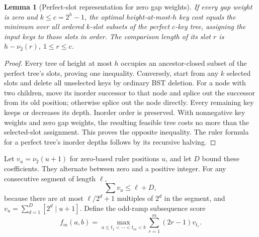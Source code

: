 \documentclass[11pt]{article}
\newtheorem{lemma}[theorem]{Lemma}
\begin{document}
\begin{lemma}[Perfect-slot representation for zero gap weights]
\label{lem:perfect-slots}
If every gap weight is zero and $k\le c=2^h-1$, the optimal height-at-most-$h$
key cost equals the minimum over all ordered $k$-slot subsets of the perfect
$c$-key tree, assigning the input keys to those slots in order. The comparison
length of its slot $r$ is $h-\nu_2(r)$, $1\le r\le c$.
\end{lemma}
\begin{proof}
Every tree of height at most $h$ occupies an ancestor-closed subset of the
perfect tree's slots, proving one inequality. Conversely, start from any
$k$ selected slots and delete all unselected keys by ordinary BST deletion.
For a node with two children, move its inorder successor to that node and
splice out the successor from its old position; otherwise splice out the
node directly. Every remaining key keeps or decreases its depth. Inorder
order is preserved. With nonnegative key weights and zero gap weights,
the resulting feasible tree costs no more than the selected-slot assignment.
This proves the opposite inequality. The ruler formula for a perfect tree's
inorder depths follows by its recursive halving.
\end{proof}

Let $v_u=\nu_2(u+1)$ for zero-based ruler positions $u$, and let $D$ bound
these coefficients. They alternate between zero and a positive integer.
For any consecutive segment of length $\ell$,
\begin{equation}\label{eq:ruler-segment-mass}
 \sum v_u\le \ell+D,
\end{equation}
because there are at most $\ell/2^d+1$ multiples of $2^d$ in the segment,
and $v_u=\sum_{d=1}^D[2^d\mid u+1]$.
Define the odd-ramp subsequence score
\[
 f_m(a,b)=\max_{a\le t_1<\cdots<t_m<b}
                    \sum_{r=1}^m(2r-1)v_{t_r}.
\]
\end{document}
